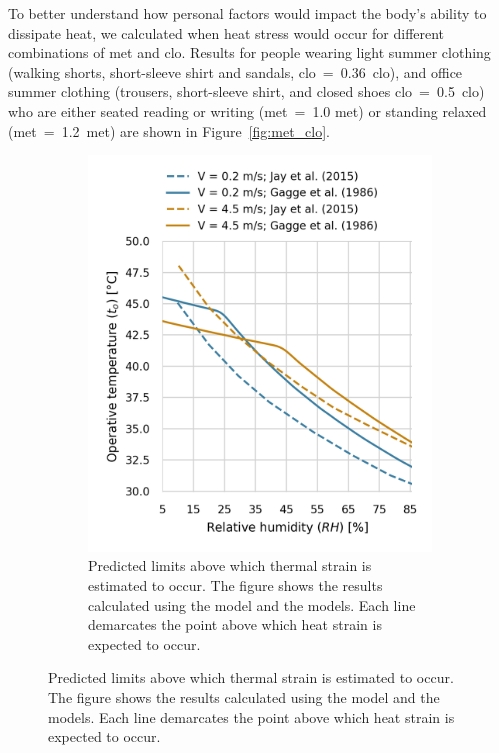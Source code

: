 To better understand how personal factors would impact the body's ability to dissipate heat, we calculated when heat stress would occur for different combinations of \ac{met} and \ac{clo}.
Results for people wearing light summer clothing (walking shorts, short-sleeve shirt and sandals, \acs{clo}~=~0.36~clo), and office summer clothing (trousers, short-sleeve shirt, and closed shoes \acs{clo}~=~0.5~clo) who are either seated reading or writing (\ac{met}~=~1.0 met) or standing relaxed (\ac{met}~=~1.2~met) are shown in Figure~\ref{fig:met_clo}.

\begin{figure}[hbt!]
    \centering
    \hfill
    \begin{subfigure}[t]{0.47\textwidth}
    \centering
    \includegraphics[width=\textwidth]{figures/comparison_air_speed}
    \caption{Predicted limits above which thermal strain is estimated to occur.
    The figure shows the results calculated using the  model and the  models.
    Each line demarcates the point above which heat strain is expected to occur.}
    \label{fig:comparison_air_speed}
    \end{subfigure}

\end{figure}
